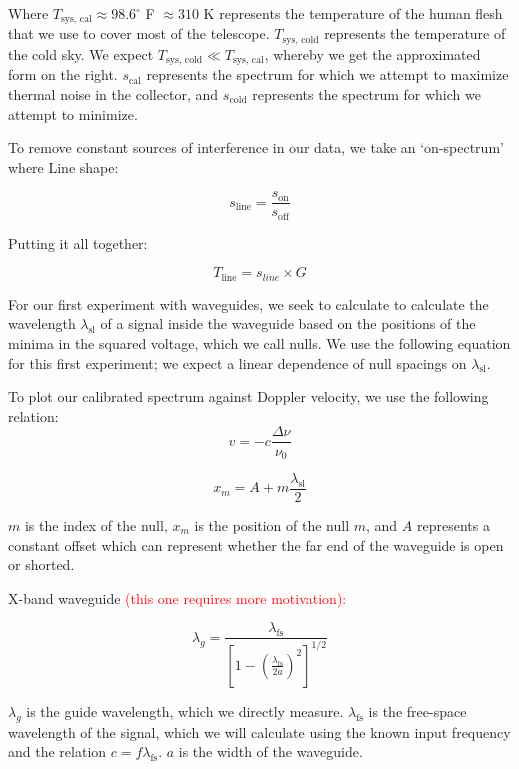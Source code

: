 \documentclass[12pt]{article}
\begin{document}
Where $T_\text{sys, cal} \approx 98.6^\circ$ F $\approx 310$ K represents the temperature of the human flesh that we use to cover most of the telescope. $T_\text{sys, cold}$ represents the temperature of the cold sky. We expect $T_\text{sys, cold} \ll T_\text{sys, cal}$, whereby we get the approximated form on the right. $s_\text{cal}$ represents the spectrum for which we attempt to maximize thermal noise in the collector, and $s_\text{cold}$ represents the spectrum for which we attempt to minimize.

To remove constant sources of interference in our data, we take an `on-spectrum' where 
Line shape:

\begin{equation}
s_\text{line} = \frac{s_\text{on}}{s_\text{off}}
\end{equation}

Putting it all together:

\begin{equation}
T_\text{line} = s_{line} \times G
\end{equation}

For our first experiment with waveguides, we seek to calculate to calculate the wavelength $\lambda_\text{sl}$ of a signal inside the waveguide based on the positions of the minima in the squared voltage, which we call nulls. We use the following equation for this first experiment; we expect a linear dependence of null spacings on $\lambda_\text{sl}$.

To plot our calibrated spectrum against Doppler velocity, we use the following relation:
\begin{equation}
v = -c \frac{\Delta \nu}{\nu_0}
\end{equation}

\begin{equation}
x_m = A + m \frac{\lambda_\text{sl}}{2}
\end{equation}

$m$ is the index of the null, $x_m$ is the position of the null $m$, and $A$ represents a constant offset which can represent whether the far end of the waveguide is open or shorted.

X-band waveguide \textcolor{red}{(this one requires more motivation):}

\begin{equation} \label{eq:xband}
\lambda_g = \frac{\lambda_\text{fs}}{[1 - (\frac{\lambda_\text{fs}}{2a})^2]^{1/2}}
\end{equation}

$\lambda_g$ is the guide wavelength, which we directly measure. $\lambda_\text{fs}$ is the free-space wavelength of the signal, which we will calculate using the known input frequency and the relation $c = f \lambda_\text{fs}$. $a$ is the width of the waveguide.
\end{document}
